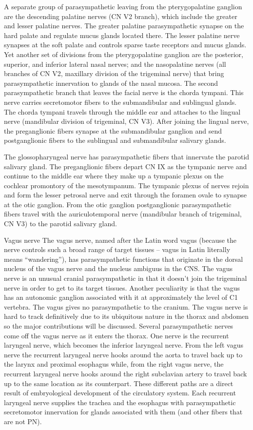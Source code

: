 \documentclass[]{book}
\begin{document}
A separate group of parasympathetic leaving from the pterygopalatine ganglion are the descending palatine nerves (CN V2 branch), which include the greater and lesser palatine nerves. The greater palatine parasympathetic synapse on the hard palate and regulate mucus glands located there. The lesser palatine nerve synapses at the soft palate and controls sparse taste receptors and mucus glands. Yet another set of divisions from the pterygopalatine ganglion are the posterior, superior, and inferior lateral nasal nerves; and the nasopalatine nerves (all branches of CN V2, maxillary division of the trigeminal nerve) that bring parasympathetic innervation to glands of the nasal mucosa. The second parasympathetic branch that leaves the facial nerve is the chorda tympani. This nerve carries secretomotor fibers to the submandibular and sublingual glands. The chorda tympani travels through the middle ear and attaches to the lingual nerve (mandibular division of trigeminal, CN V3). After joining the lingual nerve, the preganglionic fibers synapse at the submandibular ganglion and send postganglionic fibers to the sublingual and submandibular salivary glands.

The glossopharyngeal nerve has parasympathetic fibers that innervate the parotid salivary gland. The preganglionic fibers depart CN IX as the tympanic nerve and continue to the middle ear where they make up a tympanic plexus on the cochlear promontory of the mesotympanum. The tympanic plexus of nerves rejoin and form the lesser petrosal nerve and exit through the foramen ovale to synapse at the otic ganglion. From the otic ganglion postganglionic parasympathetic fibers travel with the auriculotemporal nerve (mandibular branch of trigeminal, CN V3) to the parotid salivary gland.

Vagus nerve
The vagus nerve, named after the Latin word vagus (because the nerve controls such a broad range of target tissues -- vagus in Latin literally means ``wandering''), has parasympathetic functions that originate in the dorsal nucleus of the vagus nerve and the nucleus ambiguus in the CNS. The vagus nerve is an unusual cranial parasympathetic in that it doesn't join the trigeminal nerve in order to get to its target tissues. Another peculiarity is that the vagus has an autonomic ganglion associated with it at approximately the level of C1 vertebra. The vagus gives no parasympathetic to the cranium. The vagus nerve is hard to track definitively due to its ubiquitous nature in the thorax and abdomen so the major contributions will be discussed. Several parasympathetic nerves come off the vagus nerve as it enters the thorax. One nerve is the recurrent laryngeal nerve, which becomes the inferior laryngeal nerve. From the left vagus nerve the recurrent laryngeal nerve hooks around the aorta to travel back up to the larynx and proximal esophagus while, from the right vagus nerve, the recurrent laryngeal nerve hooks around the right subclavian artery to travel back up to the same location as its counterpart. These different paths are a direct result of embryological development of the circulatory system. Each recurrent laryngeal nerve supplies the trachea and the esophagus with parasympathetic secretomotor innervation for glands associated with them (and other fibers that are not PN).
\end{document}
